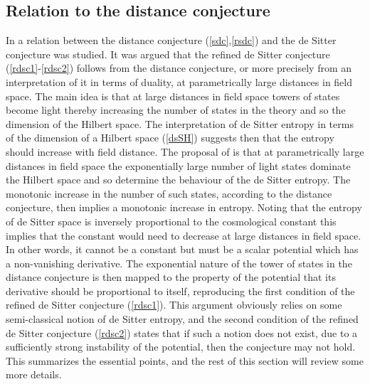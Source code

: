 \documentclass[11pt,a4paper]{article}
\numberwithin{equation}{section}
\numberwithin{table}{section}\setlength{\multlinegap}{25pt}
\begin{document}
{\subsection{Relation to the distance conjecture}
\label{sec:dsreldis}

In \cite{Ooguri:2018wrx} a relation between the distance conjecture (\ref{sdc},\ref{rsdc}) and the de Sitter conjecture was studied. It was argued that the refined de Sitter conjecture (\ref{rdsc1}-\ref{rdsc2}) follows from the distance conjecture, or more precisely from an interpretation of it in terms of duality, at parametrically large distances in field space. The main idea is that at large distances in field space towers of states become light thereby increasing the number of states in the theory and so the dimension of the Hilbert space. The interpretation of de Sitter entropy in terms of the dimension of a Hilbert space (\ref{dsSH}) suggests then that the entropy should increase with field distance. The proposal of \cite{Ooguri:2018wrx} is that at parametrically large distances in field space the exponentially large number of light states dominate the Hilbert space and so determine the behaviour of the de Sitter entropy. The monotonic increase in the number of such states, according to the distance conjecture, then implies a monotonic increase in entropy. Noting that the entropy of de Sitter space is inversely proportional to the cosmological constant this implies that the constant would need to decrease at large distances in field space. In other words, it cannot be a constant but must be a scalar potential which has a non-vanishing derivative. The exponential nature of the tower of states in the distance conjecture is then mapped to the property of the potential that its derivative should be proportional to itself, reproducing the first condition of the refined de Sitter conjecture (\ref{rdsc1}). This argument obviously relies on some semi-classical notion of de Sitter entropy, and the second condition of the refined de Sitter conjecture (\ref{rdsc2}) states that if such a notion does not exist, due to a sufficiently strong instability of the potential, then the conjecture may not hold. This summarizes the essential points, and the rest of this section will review some more details.

}
\end{document}
